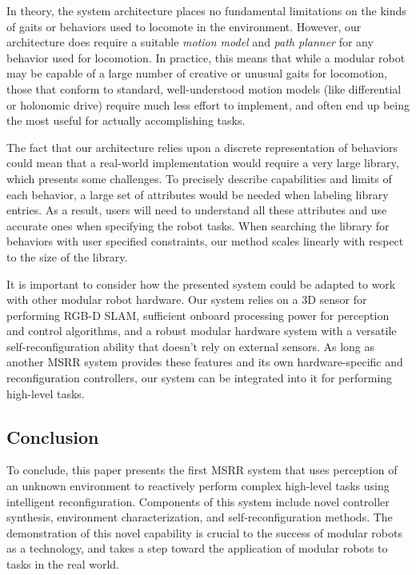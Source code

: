\documentclass[conference]{IEEEtran}
\begin{document}
In theory, the system architecture places no fundamental limitations on the kinds of gaits or behaviors used to locomote in the environment.  However, our architecture does require a suitable \textit{motion model} and \textit{path planner} for any behavior used for locomotion.  In practice, this means that while a modular robot may be capable of a large number of creative or unusual gaits for locomotion, those that conform to standard, well-understood motion models (like differential or holonomic drive) require much less effort to implement, and often end up being the most useful for actually accomplishing tasks.

The fact that our architecture relies upon a discrete representation of behaviors could mean that a real-world implementation would require a very large library, which presents some challenges. To precisely describe capabilities and limits of each behavior, a large set of attributes would be needed when labeling library entries. As a result, users will need to understand all these attributes and use accurate ones when specifying the robot tasks. 
When searching the library for behaviors with user specified constraints, our method scales linearly with respect to the size of the library.%

It is important to consider how the presented system could be adapted to work with
other modular robot hardware. Our system relies on a 3D sensor for performing RGB-D
SLAM, sufficient onboard processing power for perception and control algorithms,
and a robust modular hardware system with a versatile self-reconfiguration ability
that doesn't rely on external sensors. As long as another MSRR system provides these
features and its own hardware-specific and reconfiguration controllers, our system
can be integrated into it for performing high-level tasks.
%
\subsection{Conclusion}
%
To conclude, this paper presents the first MSRR system that uses perception of an unknown environment to reactively perform complex high-level tasks using intelligent reconfiguration. Components of this system include novel controller synthesis, environment characterization, and self-reconfiguration methods. The demonstration of this novel capability is crucial to the success of modular robots as a technology, and takes a step toward the application of modular robots to tasks in the real world.
%
%
\end{document}
